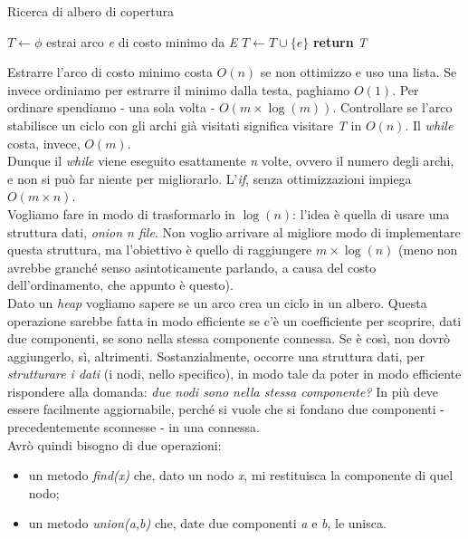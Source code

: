 \begin{algorithm}
	\caption{Ricerca di albero di copertura}\label{alg:AC}
	\begin{algorithmic}[1]
		\State $T \gets \phi$  
		\State estrai arco \textit{e} di costo minimo da \textit{E}
			\State $T \gets T \cup \{e\}$
		\EndIf
		\EndWhile
		\State \textbf{return} \textit{T}
		\EndFunction
	\end{algorithmic}
\end{algorithm}

Estrarre l'arco di costo minimo costa $O(n)$ se non ottimizzo e uso una lista. Se invece ordiniamo per estrarre il minimo dalla testa, paghiamo $O(1)$. Per ordinare spendiamo - una sola volta - $O(m\times \log(m))$. Controllare se l'arco stabilisce un ciclo con gli archi già visitati significa visitare \textit{T} in $O(n)$. Il \textit{while} costa, invece, $O(m)$. \\
Dunque il \textit{while} viene eseguito esattamente \textit{n} volte, ovvero il numero degli archi, e non si può far niente per migliorarlo. L'\textit{if}, senza ottimizzazioni impiega $O(m\times n)$. \\
Vogliamo fare in modo di trasformarlo in $\log(n)$: l'idea è quella di usare una struttura dati, \textit{onion n file}. Non voglio arrivare al migliore modo di implementare questa struttura, ma l'obiettivo è quello di raggiungere $m\times \log(n)$ (meno non avrebbe granché senso asintoticamente parlando, a causa del costo dell'ordinamento, che appunto è questo). \\
Dato un \textit{heap} vogliamo sapere se un arco crea un ciclo in un albero. Questa operazione sarebbe fatta in modo efficiente se c'è un coefficiente per scoprire, dati due componenti, se sono nella stessa componente connessa. Se è così, non dovrò aggiungerlo, sì, altrimenti. Sostanzialmente, occorre una struttura dati, per \textit{strutturare i dati} (i nodi, nello specifico), in modo tale da poter in modo efficiente rispondere alla domanda: \textit{due nodi sono nella stessa componente?} In più deve essere facilmente aggiornabile, perché si vuole che si fondano due componenti - precedentemente sconnesse - in una connessa. \\
Avrò quindi bisogno di due operazioni:
\begin{itemize}
	\item un metodo \textit{find(x)} che, dato un nodo \textit{x}, mi restituisca la componente di quel nodo;
	\item un metodo \textit{union(a,b)} che, date due componenti \textit{a} e \textit{b}, le unisca.
\end{itemize}

